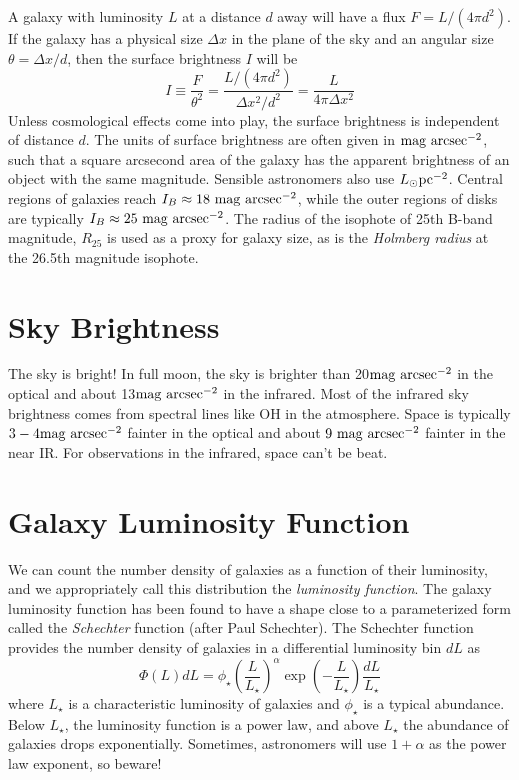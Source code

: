 \documentclass[]{article}
\begin{document}
A galaxy with luminosity $L$ at a distance $d$ away will have
a flux $F = L/(4\pi d^2)$. If the galaxy has a physical
size $\Delta x$ in the plane of the sky and an angular
size $\theta = \Delta x/d$, then the surface brightness
$I$ will be
\begin{equation}
I \equiv \frac{F}{\theta^{2}} = \frac{L/(4\pi d^2)}{\Delta x^2 / d^2} = \frac{L}{4\pi\Delta x^2}
\end{equation}
\noindent
Unless cosmological effects come into play, the surface brightness
is independent of distance $d$. The units of surface brightness are
often given in $\mathrm{mag}~\mathrm{arcsec}^{-2}$, such that a square arcsecond area
of the galaxy has the apparent brightness of an object with the
same magnitude. Sensible astronomers also use $L_{\odot}\mathrm{pc}^{-2}$. Central
regions of galaxies reach $I_{B}\approx 18~\mathrm{mag}~\mathrm{arcsec}^{-2}$, while
the outer regions of disks are typically $I_{B}\approx25~\mathrm{mag}~\mathrm{arcsec}^{-2}$.
The radius of the isophote of 25th B-band magnitude, $R_{25}$ is used as
a proxy for galaxy size, as is the {\it Holmberg radius} at the 26.5th
magnitude isophote.

\section{Sky Brightness}

The sky is bright!  In full moon, the sky is brighter than 20$\mathrm{mag}~\mathrm{arcsec}^{-2}$
in the optical and about 13$\mathrm{mag}~\mathrm{arcsec}^{-2}$ in the infrared.  Most of the
infrared sky brightness comes from spectral lines like OH in the atmosphere.
Space is typically $3-4\mathrm{mag}~\mathrm{arcsec}^{-2}$ fainter in the optical and about
$9~\mathrm{mag}~\mathrm{arcsec}^{-2}$ fainter in the near IR.  For observations in the infrared,
space can't be beat.

\section{Galaxy Luminosity Function}

We can count the number density of galaxies as a function of their luminosity,
and we appropriately call this distribution the {\it luminosity function}. The
galaxy luminosity function has been found to have a shape close to a parameterized
form called the {\it Schechter} function (after Paul Schechter).  The Schechter
function provides the number density of galaxies in a differential luminosity bin
$dL$ as
\begin{equation}
\label{eqn:schechter_function_luminosity}
\Phi(L)dL = \phi_{\star} \left(\frac{L}{L_{\star}}\right)^{\alpha}\exp\left(-\frac{L}{L_{\star}}\right)\frac{dL}{L_{\star}}
\end{equation}
\noindent
where $L_{\star}$ is a characteristic luminosity of galaxies and $\phi_{\star}$ is 
a typical abundance.  Below $L_\star$, the luminosity function is a power law, and
above $L_\star$ the abundance of galaxies drops exponentially. Sometimes, astronomers
will use $1+\alpha$ as the power law exponent, so beware!
\end{document}

